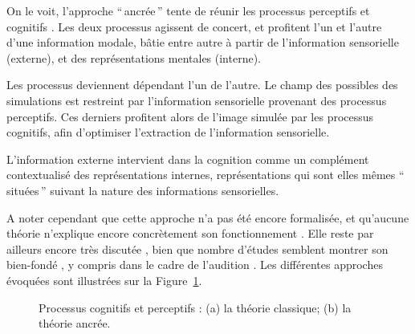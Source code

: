 On le voit, l'approche ``\,ancrée\,'' tente de réunir les processus perceptifs et cognitifs \citep{goldstone1998reuniting}. Les deux processus agissent de concert, et profitent l'un et l'autre d'une information modale, bâtie entre autre à partir de l'information sensorielle (externe), et des représentations mentales (interne).

Les processus deviennent dépendant l'un de l'autre. Le champ des possibles des simulations est restreint par l'information sensorielle provenant des processus perceptifs. Ces derniers profitent alors de l'image simulée par les processus cognitifs, afin d'optimiser l'extraction de l'information sensorielle.

L'information externe intervient dans la cognition comme un complément contextualisé des représentations internes, représentations qui sont elles mêmes ``\,situées\,'' suivant la nature des informations sensorielles.

A noter cependant que cette approche n'a pas été encore formalisée, et qu'aucune théorie n'explique encore concrètement son fonctionnement \citep{barsalou2010grounded}. Elle reste par ailleurs encore très discutée \citep{leshinskaya2016cognitive,barsalou2016staying}, bien que nombre d'études semblent montrer son bien-fondé \citep{barsalou1999perceptions,barsalou2003abstraction,barsalou2010grounded}, y compris dans le cadre de l'audition \citep{kiefer2008sound}. Les différentes approches évoquées sont illustrées sur la Figure~\ref{fig:processusPercepAndCo}.

\begin{figure}[t]
         \myfloatalign
         \par
        \caption[Processus cognitifs et perceptifs.]{Processus cognitifs et perceptifs : (a) la théorie classique; (b) la théorie ancrée.}
        \label{fig:processusPercepAndCo}
\end{figure}


